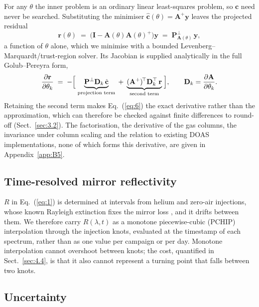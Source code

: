 For any $\theta$ the inner problem is an ordinary linear least-squares problem, so
$\mathbf{c}$ need never be searched. Substituting the minimiser
$\hat{\mathbf{c}}(\theta)=\mathbf{A}^{+}\mathbf{y}$ leaves the projected residual
\begin{equation}
\mathbf{r}(\theta)\;=\;\bigl(\mathbf{I}-\mathbf{A}(\theta)\mathbf{A}(\theta)^{+}\bigr)\mathbf{y}
\;=\;\mathbf{P}^{\perp}_{\mathbf{A}(\theta)}\,\mathbf{y},
\label{eq:5}
\end{equation}
a function of $\theta$ alone, which we minimise with a bounded
Levenberg--Marquardt/trust-region solver. Its Jacobian is supplied analytically in the full Golub--Pereyra form,
\begin{equation}
\frac{\partial \mathbf{r}}{\partial \theta_k}
\;=\;-\Bigl[\;\underbrace{\mathbf{P}^{\perp}\mathbf{D}_k\,\hat{\mathbf{c}}}_{\text{projection term}}
\;+\;\underbrace{(\mathbf{A}^{+})^{\!\top}\mathbf{D}_k^{\top}\,\mathbf{r}}_{\text{second term}}\;\Bigr],
\qquad
\mathbf{D}_k=\frac{\partial \mathbf{A}}{\partial \theta_k}.
\label{eq:6}
\end{equation}
Retaining the second term makes Eq.~(\ref{eq:6}) the exact derivative rather than the \citet{Kaufman_1975}
approximation, which can therefore be checked against finite differences to round-off (Sect.~\ref{sec:3.2}).
The factorisation, the derivative of the gas columns, the invariance under column scaling and the relation to
existing DOAS implementations, none of which forms this derivative, are given in Appendix~\ref{app:B5}.

\subsection{Time-resolved mirror reflectivity}
\label{sec:2.4}

$R$ in Eq.~(\ref{eq:1}) is determined at intervals from helium and zero-air injections, whose known Rayleigh
extinction fixes the mirror loss \citep{Washenfelder_2008}, and it drifts between them. We therefore carry
$R(\lambda,t)$ as a monotone piecewise-cubic (PCHIP) interpolation \citep{Fritsch_1980} through the injection
knots, evaluated at the timestamp of each spectrum, rather than as one value per campaign or per day. Monotone
interpolation cannot overshoot between knots; the cost, quantified in Sect.~\ref{sec:4.4}, is that it also
cannot represent a turning point that falls between two knots.

\subsection{Uncertainty}
\label{sec:2.5}

